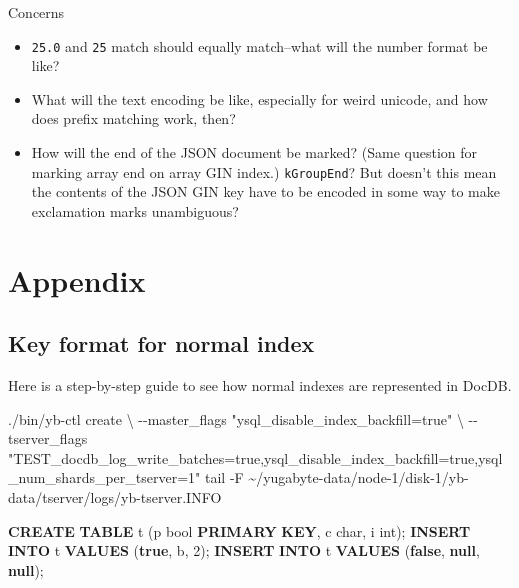 \documentclass[
]{article}
\newenvironment{Shaded}{}{}
\newcommand{\AttributeTok}[1]{\textcolor[rgb]{0.49,0.56,0.16}{#1}}
\newcommand{\DataTypeTok}[1]{\textcolor[rgb]{0.56,0.13,0.00}{#1}}
\newcommand{\DecValTok}[1]{\textcolor[rgb]{0.25,0.63,0.44}{#1}}
\newcommand{\ExtensionTok}[1]{#1}
\newcommand{\FunctionTok}[1]{\textcolor[rgb]{0.02,0.16,0.49}{#1}}
\newcommand{\KeywordTok}[1]{\textcolor[rgb]{0.00,0.44,0.13}{\textbf{#1}}}
\newcommand{\NormalTok}[1]{#1}
\newcommand{\StringTok}[1]{\textcolor[rgb]{0.25,0.44,0.63}{#1}}
\providecommand{\tightlist}{%
  \setlength{\itemsep}{0pt}\setlength{\parskip}{0pt}}
\begin{document}
Concerns

\begin{itemize}
\tightlist
\item
  \texttt{25.0} and \texttt{25} match should equally match--what will
  the number format be like?
\item
  What will the text encoding be like, especially for weird unicode, and
  how does prefix matching work, then?
\item
  How will the end of the JSON document be marked? (Same question for
  marking array end on array GIN index.) \texttt{kGroupEnd}? But doesn't
  this mean the contents of the JSON GIN key have to be encoded in some
  way to make exclamation marks unambiguous?
\end{itemize}

\hypertarget{appendix}{%
\section{Appendix}\label{appendix}}

\hypertarget{key-format-for-normal-index}{%
\subsection{Key format for normal
index}\label{key-format-for-normal-index}}

Here is a step-by-step guide to see how normal indexes are represented
in DocDB.

\begin{Shaded}
\begin{Highlighting}[]
\ExtensionTok{./bin/yb{-}ctl}\NormalTok{ create }\DataTypeTok{\textbackslash{}}
  \AttributeTok{{-}{-}master\_flags} \StringTok{"ysql\_disable\_index\_backfill=true"} \DataTypeTok{\textbackslash{}}
  \AttributeTok{{-}{-}tserver\_flags} \StringTok{"TEST\_docdb\_log\_write\_batches=true,ysql\_disable\_index\_backfill=true,ysql\_num\_shards\_per\_tserver=1"}
\FunctionTok{tail} \AttributeTok{{-}F}\NormalTok{ \textasciitilde{}/yugabyte{-}data/node{-}1/disk{-}1/yb{-}data/tserver/logs/yb{-}tserver.INFO}
\end{Highlighting}
\end{Shaded}

\begin{Shaded}
\begin{Highlighting}[]
\KeywordTok{CREATE} \KeywordTok{TABLE}\NormalTok{ t (p bool }\KeywordTok{PRIMARY} \KeywordTok{KEY}\NormalTok{, c }\DataTypeTok{char}\NormalTok{, i }\DataTypeTok{int}\NormalTok{);}
\KeywordTok{INSERT} \KeywordTok{INTO}\NormalTok{ t }\KeywordTok{VALUES}\NormalTok{ (}\KeywordTok{true}\NormalTok{, }\StringTok{\textquotesingle{}b\textquotesingle{}}\NormalTok{, }\DecValTok{2}\NormalTok{);}
\KeywordTok{INSERT} \KeywordTok{INTO}\NormalTok{ t }\KeywordTok{VALUES}\NormalTok{ (}\KeywordTok{false}\NormalTok{, }\KeywordTok{null}\NormalTok{, }\KeywordTok{null}\NormalTok{);}
\end{Highlighting}
\end{Shaded}
\end{document}
